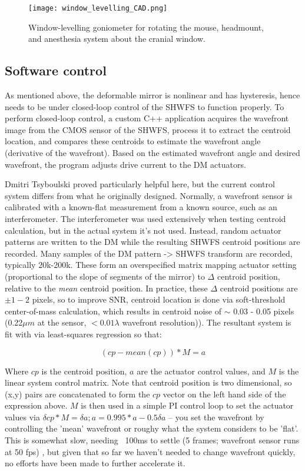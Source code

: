 \documentclass[a4paper,12pt]{article}
\begin{document}
\begin{figure}
\label{window_level}
\centering
\texttt{[image: window\_levelling\_CAD.png]}
\caption{Window-levelling goniometer for rotating the mouse, headmount, and anesthesia system about the cranial window. }
\end{figure}

\subsection{Software control}

As mentioned above, the deformable mirror is nonlinear and has hysteresis, hence needs to be under closed-loop control of the SHWFS to function properly.  To perform closed-loop control, a custom C++ application acquires the wavefront image from the CMOS sensor of the SHWFS, process it to extract the centroid location, and compares these centroids to estimate the wavefront angle (derivative of the wavefront).  Based on the estimated wavefront angle and desired wavefront, the program adjusts drive current to the DM actuators.  

Dmitri Tsyboulski proved particularly helpful here, but the current control system differs from what he originally designed.  Normally, a wavefront sensor is calibrated with a known-flat measurement from a known source, such as an interferometer.  The interferometer was used extensively when testing centroid calculation, but in the actual system it's not used.  Instead, random actuator patterns are written to the DM while the resulting SHWFS centroid positions are recorded.  Many samples of the DM pattern -> SHWFS transform are recorded, typically 20k-200k.  These form an overspecified matrix mapping actuator setting (proportional to the slope of segments of the mirror) to $\Delta$ centroid position, relative to the \textsl{mean} centroid position.  In practice, these $\Delta$ centroid positions are $\pm 1-2$ pixels, so to improve SNR, centroid location is done via soft-threshold center-of-mass calculation, which results in centroid noise of $\sim$ 0.03 - 0.05 pixels (0.22$\mu m$ at the sensor, $< 0.01 \lambda $ wavefront resolution)).  The resultant system is fit with via least-squares regression so that: 

$$ (cp - mean(cp)) * M = a $$

Where $cp$ is the centroid position, $a$ are the actuator control values, and $M$ is the linear system control matrix.  Note that centroid position is two dimensional, so (x,y) pairs are concatenated to form the $cp$ vector on the left hand side of the expression above. $M$ is then used in a simple PI control loop to set the actuator values via $\delta cp * M = \delta a ; a = 0.995 * a - 0.5 \delta a$ -- you set the wavefront by controlling the 'mean' wavefront or roughy what the system considers to be 'flat'.  This is somewhat slow, needing ~100ms to settle (5 frames; wavefront sensor runs at 50 fps) , but given that so far we haven't needed to change wavefront quickly, no efforts have been made to further accelerate it.  
\end{document}
